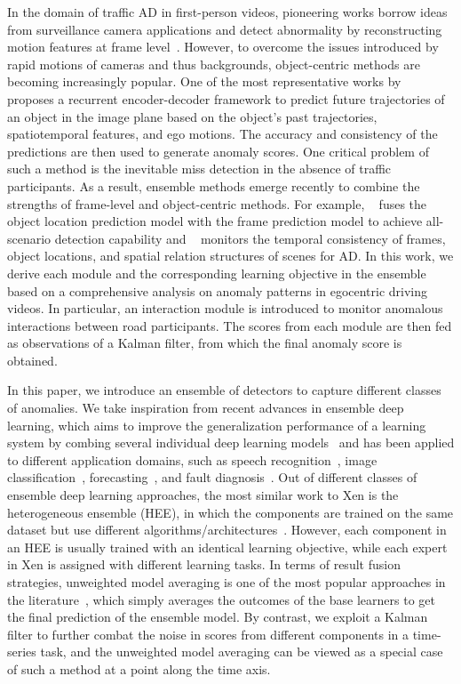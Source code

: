 In the domain of traffic AD in first-person videos, pioneering works borrow ideas from surveillance camera applications and detect abnormality by reconstructing motion features at frame level~\citep{yuan2016anomaly}. However, to overcome the issues introduced by rapid motions of cameras and thus backgrounds, object-centric methods are becoming increasingly popular. One of the most representative works by~\cite{yao2019unsupervised} proposes a recurrent encoder-decoder framework to predict future trajectories of an object in the image plane based on the object's past trajectories, spatiotemporal features, and ego motions. The accuracy and consistency of the predictions are then used to generate anomaly scores. One critical problem of such a method is the inevitable miss detection in the absence of traffic participants. As a result, ensemble methods emerge recently to combine the strengths of frame-level and object-centric methods. For example, ~\cite{yao2022dota} fuses the object location prediction model with the frame prediction model to achieve all-scenario detection capability and ~\cite{fang2022traffic} monitors the temporal consistency of frames, object locations, and spatial relation structures of scenes for AD. In this work, we derive each module and the corresponding learning objective in the ensemble based on a comprehensive analysis on anomaly patterns in egocentric driving videos. In particular, an interaction module is introduced to monitor anomalous interactions between road participants. The scores from each module are then fed as observations of a Kalman filter, from which the final anomaly score is obtained.

In this paper, we introduce an ensemble of detectors to capture different classes of anomalies.
We take inspiration from recent advances in ensemble deep learning, which aims to improve the generalization performance of a learning system by combing several individual deep learning models~\citep{ganaie2022ensemble} and has been applied to different application domains, such as speech recognition~\citep{li2017semi},  image classification~\citep{wang2020particle}, forecasting~\citep{singla2022ensemble}, and fault diagnosis~\citep{wen2022new}. Out of different classes of ensemble deep learning approaches, the most similar work to Xen is the heterogeneous ensemble (HEE), in which the components are trained on the same dataset but use different algorithms/architectures~\citep{li2018heterogeneous,tabik2020mnist}. However, each component in an HEE is usually trained with an identical learning objective, while each expert in Xen is assigned with different learning tasks. In terms of result fusion strategies, unweighted model averaging is one of the most popular approaches in the literature~\citep{ganaie2022ensemble}, which simply averages the outcomes of the base learners to get the final prediction of the ensemble model. By contrast, we exploit a Kalman filter to further combat the noise in scores from different components in a time-series task, and the unweighted model averaging can be viewed as a special case of such a method at a point along the time axis.